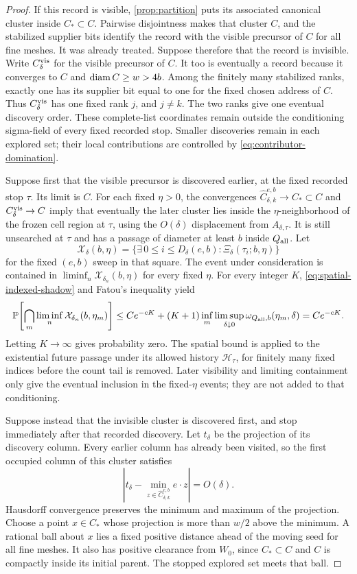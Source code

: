 \begin{proof}
If this record is visible, \cref{prop:partition} puts its associated
canonical cluster inside \(C_*\subset C\). Pairwise disjointness makes
that cluster \(C\), and the stabilized supplier bits identify the
record with the visible precursor of \(C\) for all fine meshes.
It was already treated. Suppose therefore that the record is invisible.
Write \(C_\delta^{\rm vis}\) for the visible precursor of \(C\).
It too is eventually a record because it converges to \(C\) and
\(\diam C\ge w>4b\). Among the finitely many stabilized ranks, exactly
one has its supplier bit equal to one for the fixed chosen address of
\(C\). Thus \(C_\delta^{\rm vis}\)
has one fixed rank \(j\), and \(j\ne k\). The two ranks give one
eventual discovery order. These complete-list coordinates remain
outside the conditioning sigma-field of every fixed recorded stop.
Smaller discoveries remain in each explored set; their local
contributions are controlled by \cref{eq:contributor-domination}.

Suppose first that the visible precursor is discovered earlier, at
the fixed recorded stop \(\tau\). Its limit is \(C\).
For each fixed \(\eta>0\), the convergences
\(\widehat C_{\delta,k}^{e,b}\to C_*\subset C\) and
\(C_\delta^{\rm vis}\to C\)
imply that eventually the later cluster lies inside the
\(\eta\)-neighborhood of the frozen cell region at \(\tau\), using
the \(O(\delta)\) displacement from \(A_{\delta,\tau}\). It is still unsearched
at \(\tau\) and has a passage of diameter at least \(b\) inside
\(Q_{\rm all}\). Let
\[
 \mathcal X_\delta(b,\eta)=
 \{\exists\,0\le i\le D_\delta(e,b):
              \Xi_\delta(\tau_i;b,\eta)\}
\]
for the fixed \((e,b)\) sweep in that square. The event under
consideration is contained in \(\liminf_n\mathcal X_{\delta_n}(b,\eta)\)
for every fixed \(\eta\). For every integer \(K\),
\cref{eq:spatial-indexed-shadow} and Fatou's inequality yield
\[
 \P\!\left[\bigcap_m\liminf_n
             \mathcal X_{\delta_n}(b,\eta_m)\right]
 \le Ce^{-cK}+(K+1)\inf_m\limsup_{\delta\downarrow0}
          \omega_{Q_{\rm all},b}(\eta_m,\delta)
 =Ce^{-cK}.
\]
Letting \(K\to\infty\) gives probability zero. The spatial bound is
applied to the existential future passage under its allowed history
\(\mathcal H_\tau\), for finitely many fixed indices before the count tail is
removed. Later visibility and limiting containment only give the
eventual inclusion in the fixed-\(\eta\) events; they are not added
to that conditioning.

Suppose instead that the invisible cluster is discovered first, and
stop immediately after that recorded discovery. Let \(t_\delta\) be
the projection of its discovery column. Every earlier column has
already been visited, so the first occupied column of this cluster
satisfies
\[
 \left|t_\delta-
       \min_{z\in\widehat C_{\delta,k}^{e,b}}e\cdot z\right|=O(\delta).
\]
Hausdorff convergence preserves the minimum and maximum of the
projection. Choose a point \(x\in C_*\) whose projection is more
than \(w/2\) above the minimum. A rational ball about \(x\) lies
a fixed positive distance ahead of the moving seed for all fine
meshes. It also has positive clearance from \(W_0\), since
\(C_*\subset C\) and \(C\) is compactly inside its initial parent.
The stopped explored set meets that ball.


\end{proof}
